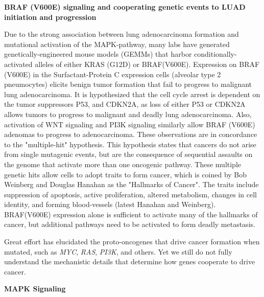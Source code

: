 \textbf{BRAF (V600E) signaling and cooperating genetic events to LUAD initiation and progression}

Due to the strong association between lung adenocarcinoma formation and mutational activation of the MAPK-pathway, many labs have generated genetically-engineered mouse models (GEMMs) that harbor conditionally-activated alleles of either KRAS (G12D) or BRAF(V600E). Expression on BRAF (V600E) in the Surfactant-Protein C expression cells (alveolar type 2 pneumocytes) elicits benign tumor formation that fail to progress to malignant lung adenocarcinoma. It is hypothesized that the cell cycle arrest is dependent on the tumor suppressors P53, and CDKN2A, as loss of either P53 or CDKN2A allows tumors to progress to malignant and deadly lung adenocarcinoma. Also, activation of WNT signaling and PI3K signaling similarly allow BRAF (V600E) adenomas to progress to adenocarcinoma. These observations are in concordance to the "multiple-hit" hypothesis. This hypothesis states that cancers do not arise from single mutagenic events, but are the consequence of sequential assaults on the genome that activate more than one oncogenic pathway. These multiple genetic hits allow cells to adopt traits to form cancer, which is coined by Bob Weinberg and Douglas Hanahan as the "Hallmarks of Cancer". The traits include suppression of apoptosis, active proliferation, altered metabolism, changes in cell identity, and forming blood-vessels (latest Hanahan and Weinberg). BRAF(V600E) expression alone is sufficient to activate many of the hallmarks of cancer, but additional pathways need to be activated to form deadly metastasis.

Great effort has elucidated the proto-oncogenes that drive cancer formation when mutated, such as \emph{MYC}, \emph{RAS}, \emph{PI3K}, and others. Yet we still do not fully understand the mechanistic details that determine how genes cooperate to drive cancer.

\textbf{MAPK Signaling}

